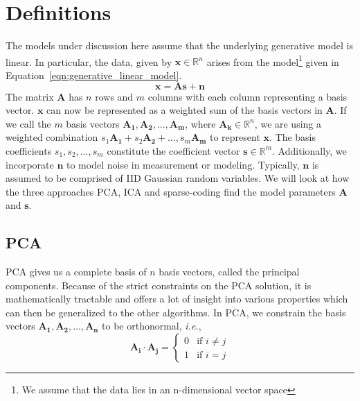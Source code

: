 \documentclass[10pt,onecolumn]{article}
\begin{document}
    \section{Definitions}
    \label{sec:definitions}
    The models under discussion here assume that the underlying generative model is linear.
    In particular, the data, given by $\mathbf{x}\in\mathbb{R}^n$ arises from the model\footnote{We assume that the data lies in an n-dimensional vector space} given in Equation~\ref{eqn:generative_linear_model}.
    \begin{equation}
        \mathbf{x} = \mathbf{A}\mathbf{s} + \mathbf{n}
        \label{eqn:generative_linear_model}
    \end{equation}
    The matrix $\mathbf{A}$ has $n$ rows and $m$ columns with each column representing a basis vector.
    $\mathbf{x}$ can now be represented as a weighted sum of the basis vectors in $\mathbf{A}$.
    If we call the $m$ basis vectors $\mathbf{A_1}, \mathbf{A_2}, \dots, \mathbf{A_m}$, where $\mathbf{A_k}\in\mathbb{R}^n$, we are using a weighted combination $s_1\mathbf{A_1} + s_2\mathbf{A_2} + \dots, s_m\mathbf{A_m}$ to represent $\mathbf{x}$.
    The basis coefficients $s_1,s_2,\dots,s_m$ constitute the coefficient vector $\mathbf{s}\in\mathbb{R}^m$.
    Additionally, we incorporate $\mathbf{n}$ to model noise in measurement or modeling. 
    Typically, $\mathbf{n}$ is assumed to be comprised of \ac{IID} Gaussian random variables.
    We will look at how the three approaches \ac{PCA}, \ac{ICA} and sparse-coding find the model parameters $\mathbf{A}$ and $\mathbf{s}$.

    \subsection{\ac{PCA}}
    \label{sec:def_pca}
    \ac{PCA} gives us a complete basis of $n$ basis vectors, called the principal components.
    Because of the strict constraints on the \ac{PCA} solution, it is mathematically tractable and offers a lot of insight into various properties which can then be generalized to the other algorithms.
    In \ac{PCA}, we constrain the basis vectors $\mathbf{A_1},\mathbf{A_2},\dots,\mathbf{A_n}$ to be orthonormal, \textit{i.e.},
    \begin{equation}
        \mathbf{A_i}\cdot\mathbf{A_j} =
            \left\{
                \begin{array}{ll}
                    0 & \mbox{if } i\neq j \\
                    1 & \mbox{if } i = j
                \end{array}
            \right.
        \label{eqn:orthonormality_of_A}
    \end{equation}
\end{document}
